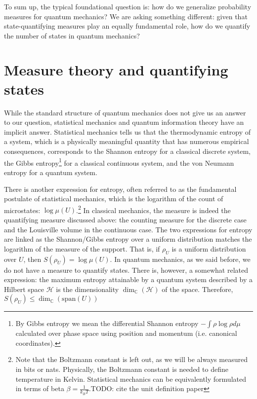 \documentclass[10pt,twocolumn, nofootinbib]{revtex4-2}
\begin{document}
To sum up, the typical foundational question is: how do we generalize probability measures for quantum mechanics? We are asking something different: given that state-quantifying measures play an equally fundamental role, how do we quantify the number of states in quantum mechanics?

\section{Measure theory and quantifying states}

While the standard structure of quantum mechanics does not give us an answer to our question, statistical mechanics and quantum information theory have an implicit answer. Statistical mechanics tells us that the thermodynamic entropy of a system, which is a physically meaningful quantity that has numerous empirical consequences, corresponds to the Shannon entropy for a classical discrete system, the Gibbs entropy\footnote{By Gibbs entropy we mean the differential Shannon entropy $-\int \rho \log \rho d\mu$ calculated over phase space using position and momentum (i.e. canonical coordinates).} for a classical continuous system, and the von Neumann entropy for a quantum system.

There is another expression for entropy, often referred to as the fundamental postulate of statistical mechanics, which is the logarithm of the count of microstates: $\log \mu(U)$.\footnote{Note that the Boltzmann constant is left out, as we will be always measured in bits or nats. Physically, the Boltzmann constant is needed to define temperature in Kelvin. Statistical mechanics can be equivalently formulated in terms of beta $\beta = \frac{1}{k_B T}$.TODO: cite the unit definition paper} In classical mechanics, the measure is indeed the quantifying measure discussed above: the counting measure for the discrete case and the Louisville volume in the continuous case. The two expressions for entropy are linked as the Shannon/Gibbs entropy over a uniform distribution matches the logarithm of the measure of the support. That is, if $\rho_U$ is a uniform distribution over $U$, then $S(\rho_U) = \log \mu(U)$. In quantum mechanics, as we said before, we do not have a measure to quantify states. There is, however, a somewhat related expression: the maximum entropy attainable by a quantum system described by a Hilbert space $\mathcal{H}$ is the dimensionality $\dim_{\mathbb{C}}(\mathcal{H})$ of the space. Therefore, $ S(\rho_U) \leq \dim_{\mathbb{C}}(\text{span}(U))$
\end{document}
